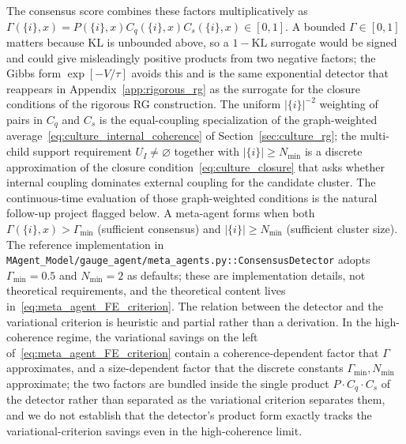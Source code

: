 \documentclass[11pt]{article}
\begin{document}
The consensus score combines these factors multiplicatively as $\Gamma(\{i\}, x) = P(\{i\}, x) C_q(\{i\}, x) C_s(\{i\}, x) \in [0, 1]$. A bounded $\Gamma \in [0, 1]$ matters because $\mathrm{KL}$ is unbounded above, so a $1 - \mathrm{KL}$ surrogate would be signed and could give misleadingly positive products from two negative factors; the Gibbs form $\exp[-V/\tau]$ avoids this and is the same exponential detector that reappears in Appendix~\ref{app:rigorous_rg} as the surrogate for the closure conditions of the rigorous RG construction. The uniform $|\{i\}|^{-2}$ weighting of pairs in $C_q$ and $C_s$ is the equal-coupling specialization of the graph-weighted average~\eqref{eq:culture_internal_coherence} of Section~\ref{sec:culture_rg}; the multi-child support requirement $U_I \neq \varnothing$ together with $|\{i\}| \geq N_{\min}$ is a discrete approximation of the closure condition~\eqref{eq:culture_closure} that asks whether internal coupling dominates external coupling for the candidate cluster. The continuous-time evaluation of those graph-weighted conditions is the natural follow-up project flagged below. A meta-agent forms when both $\Gamma(\{i\}, x) > \Gamma_{\min}$ (sufficient consensus) and $|\{i\}| \geq N_{\min}$ (sufficient cluster size). The reference implementation in \texttt{MAgent\_Model/gauge\_agent/meta\_agents.py::ConsensusDetector} adopts $\Gamma_{\min} = 0.5$ and $N_{\min} = 2$ as defaults; these are implementation details, not theoretical requirements, and the theoretical content lives in~\eqref{eq:meta_agent_FE_criterion}. The relation between the detector and the variational criterion is heuristic and partial rather than a derivation. In the high-coherence regime, the variational savings on the left of~\eqref{eq:meta_agent_FE_criterion} contain a coherence-dependent factor that $\Gamma$ approximates, and a size-dependent factor that the discrete constants $\Gamma_{\min}, N_{\min}$ approximate; the two factors are bundled inside the single product $P \cdot C_q \cdot C_s$ of the detector rather than separated as the variational criterion separates them, and we do not establish that the detector's product form exactly tracks the variational-criterion savings even in the high-coherence limit.
\end{document}
